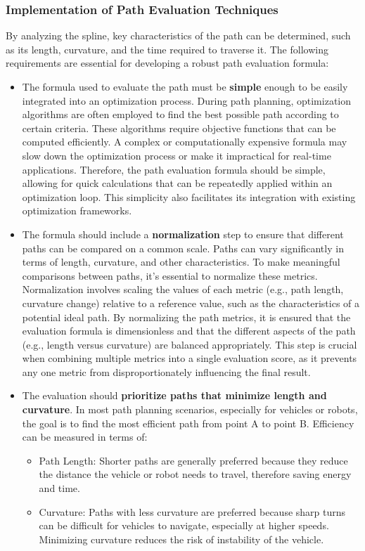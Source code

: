 \subsubsection{Implementation of Path Evaluation Techniques}
By analyzing the spline,  key characteristics of the path can be determined, such as its length, curvature, and 
the time required to traverse it. The following requirements are essential for developing a robust path 
evaluation formula:
\begin{itemize}
    \item The formula used to evaluate the path must be \textbf{simple} enough to be easily integrated into an optimization process.
    During path planning, optimization algorithms are often employed to find the best possible path according to certain 
    criteria. These algorithms require objective functions that can be computed efficiently. A complex or computationally 
    expensive formula may slow down the optimization process or make it impractical for real-time applications. 
    Therefore, the path evaluation formula should be simple, allowing for quick calculations that can be repeatedly 
    applied within an optimization loop. This simplicity also facilitates its integration with existing optimization 
    frameworks.
    \item The formula should include a \textbf{normalization} step to ensure that different paths can be compared on a common scale.
    Paths can vary significantly in terms of length, curvature, and other characteristics. To make meaningful 
    comparisons between paths, it’s essential to normalize these metrics. Normalization involves scaling the values of 
    each metric (e.g., path length, curvature change) relative to a reference value, such as the characteristics of 
    a potential ideal path. By normalizing the path metrics, it is ensured that the evaluation formula is 
    dimensionless and that the different aspects of the path (e.g., length versus curvature) are balanced 
    appropriately. This step is crucial when combining multiple metrics into a single evaluation score, as it 
    prevents any one metric from disproportionately influencing the final result.
    \item The evaluation should \textbf{prioritize paths that minimize length and curvature}.  In most path planning scenarios, 
    especially for vehicles or robots, the goal is to find the most efficient path from point A to point B. 
    Efficiency can be measured in terms of:
    \begin{itemize}
        \item Path Length: Shorter paths are generally preferred because they reduce the distance the vehicle or robot 
        needs to travel, therefore saving energy and time.
        \item Curvature: Paths with less curvature are preferred because sharp turns can be difficult for vehicles 
        to navigate, especially at higher speeds. Minimizing curvature reduces the risk of instability of the vehicle.
    \end{itemize}
    
\end{itemize}

